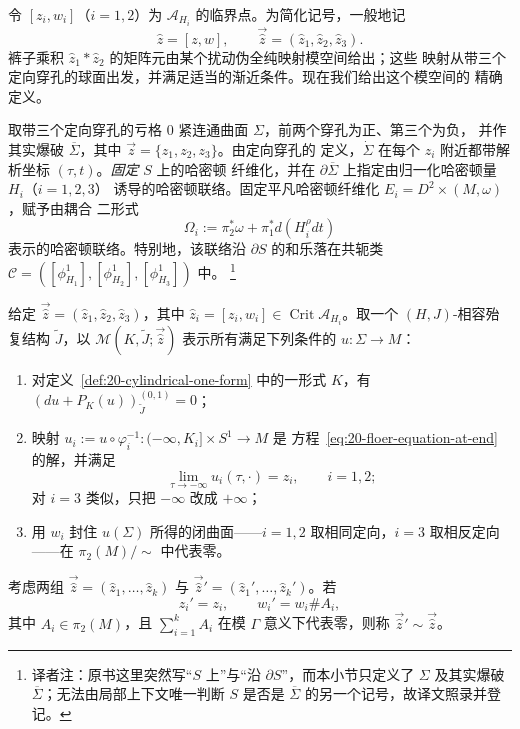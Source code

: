 令 $[z_i,w_i]$（$i=1,2$）为 $\mathcal A_{H_i}$ 的临界点。为简化记号，一般地记
\[
 \widehat z=[z,w],\qquad
 \vec{\widehat z}=(\widehat z_1,\widehat z_2,\widehat z_3).
\]
裤子乘积 $\widehat z_1*\widehat z_2$ 的矩阵元由某个扰动伪全纯映射模空间给出；这些
映射从带三个定向穿孔的球面出发，并满足适当的渐近条件。现在我们给出这个模空间的
精确定义。

取带三个定向穿孔的亏格 $0$ 紧连通曲面 $\Sigma$，前两个穿孔为正、第三个为负，
并作其实爆破 $\overline\Sigma$，其中 $\vec z=\{z_1,z_2,z_3\}$。由定向穿孔的
定义，$\dot\Sigma$ 在每个 $z_i$ 附近都带解析坐标 $(\tau,t)$。\emph{固定} $S$ 上的哈密顿
纤维化，并在 $\partial\overline\Sigma$ 上指定由归一化哈密顿量 $H_i$（$i=1,2,3$）
诱导的哈密顿联络。固定平凡哈密顿纤维化 $E_i=D^2\times(M,\omega)$，赋予由耦合
二形式
\[
 \Omega_i:=\pi_2^*\omega+\pi_1^*d(H_i^\rho dt)
\]
表示的哈密顿联络。特别地，该联络沿 $\partial S$ 的和乐落在共轭类
$\mathcal C=([\phi_{H_1}^1],[\phi_{H_2}^1],[\phi_{H_3}^1])$ 中。
\footnote{译者注：原书这里突然写“$S$ 上”与“沿 $\partial S$”，而本小节只定义了
$\Sigma$ 及其实爆破 $\overline\Sigma$；无法由局部上下文唯一判断 $S$ 是否是
$\overline\Sigma$ 的另一个记号，故译文照录并登记。}

给定 $\vec{\widehat z}=(\widehat z_1,\widehat z_2,\widehat z_3)$，其中
$\widehat z_i=[z_i,w_i]\in\operatorname{Crit}\mathcal A_{H_i}$。取一个
$(H,J)$-相容殆复结构 $\widetilde J$，以
$\mathcal M(K,\widetilde J;\vec{\widehat z})$ 表示所有满足下列条件的
$u:\Sigma\to M$：
\begin{enumerate}[label=(\arabic*)]
\item 对定义~\ref{def:20-cylindrical-one-form} 中的一形式 $K$，有
$(du+P_K(u))_{\widetilde J}^{(0,1)}=0$；
\item 映射 $u_i:=u\circ\varphi_i^{-1}:(-\infty,K_i]\times S^1\to M$ 是
方程~\eqref{eq:20-floer-equation-at-end} 的解，并满足
\[
 \lim_{\tau\to-\infty}u_i(\tau,\cdot)=z_i,\qquad i=1,2;
\]
对 $i=3$ 类似，只把 $-\infty$ 改成 $+\infty$；
\item 用 $w_i$ 封住 $u(\Sigma)$ 所得的闭曲面——$i=1,2$ 取相同定向，$i=3$
取相反定向——在 $\pi_2(M)/\sim$ 中代表零。
\end{enumerate}

\begin{definition}
\label{def:20-equivalent-lift-sets}
考虑两组
$\vec{\widehat z}=(\widehat z_1,\ldots,\widehat z_k)$ 与
$\vec{\widehat z}'=(\widehat z_1',\ldots,\widehat z_k')$。若
\[
 z_i'=z_i,\qquad w_i'=w_i\#A_i,
\]
其中 $A_i\in\pi_2(M)$，且 $\sum_{i=1}^kA_i$ 在模 $\Gamma$ 意义下代表零，则称
$\vec{\widehat z}'\sim\vec{\widehat z}$。
\end{definition}


